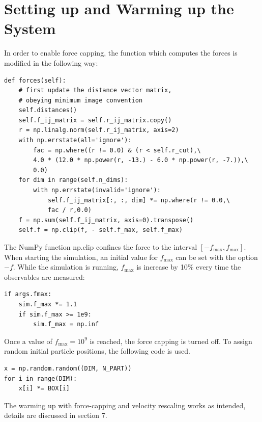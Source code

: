\documentclass[a4paper,10pt,bibtotoc]{scrartcl}
\begin{document}
\section{Setting up and Warming up the System}
In order to enable force capping, the function which computes the forces is modified in the following way:
\begin{lstlisting}
def forces(self):
    # first update the distance vector matrix,
    # obeying minimum image convention
    self.distances()
    self.f_ij_matrix = self.r_ij_matrix.copy()
    r = np.linalg.norm(self.r_ij_matrix, axis=2)
    with np.errstate(all='ignore'):
        fac = np.where((r != 0.0) & (r < self.r_cut),\
        4.0 * (12.0 * np.power(r, -13.) - 6.0 * np.power(r, -7.)),\
        0.0)
    for dim in range(self.n_dims):
        with np.errstate(invalid='ignore'):
            self.f_ij_matrix[:, :, dim] *= np.where(r != 0.0,\
            fac / r,0.0)
    f = np.sum(self.f_ij_matrix, axis=0).transpose()
    self.f = np.clip(f, - self.f_max, self.f_max)
\end{lstlisting}
The NumPy function np.clip confines the force to the interval $[-f_\mathrm{max},f_\mathrm{max}]$.
When starting the simulation, an initial value for $f_\mathrm{max}$ can be set with the option $-f$. 
While the simulation is running, $f_\mathrm{max}$ is increase by 10\% every time the observables are measured:
\begin{lstlisting}
if args.fmax:
    sim.f_max *= 1.1
    if sim.f_max >= 1e9:
        sim.f_max = np.inf
\end{lstlisting}
Once a value of $f_\mathrm{max}=10^9$ is reached, the force capping is turned off.
To assign random initial particle positions, the following code is used.
\begin{lstlisting}
x = np.random.random((DIM, N_PART))
for i in range(DIM):
    x[i] *= BOX[i]
\end{lstlisting}
The warming up with force-capping and velocity rescaling works as intended, details are discussed in section 7.

\newpage
\end{document}

